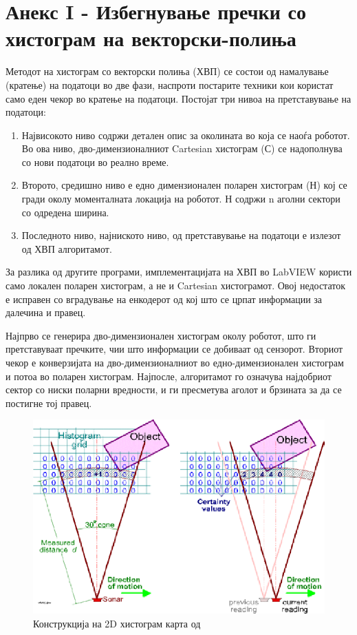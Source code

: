 \documentclass[12pt]{article}
\begin{document}
\section{Анекс I - Избегнување пречки со хистограм на векторски-полиња} %
  \label{sec:app1-avoidance}
  Методот на хистограм со векторски полиња (ХВП) се состои од намалување (кратење) на податоци во две фази, наспроти постарите техники кои користат само еден чекор во кратење на податоци. Постојат три нивоа на претставување на податоци:

  \begin{enumerate}
    \item Највисокото ниво содржи детален опис за околината во која се наоѓа роботот. Во ова ниво, дво-димензионалниот Cartesian хистограм (С) се надополнува со нови податоци во реално време.
    \item Второто, средишно ниво е едно димензионален поларен хистограм (Н) кој се гради околу моменталната локација на роботот. Н содржи n аголни сектори со одредена ширина.
    \item Последното ниво, најниското ниво, од претставување на податоци е излезот од ХВП алгоритамот.
    \end{enumerate}

  За разлика од другите програми, имплементацијата на ХВП во LabVIEW користи само локален поларен хистограм, а не и Cartesian хистограмот. Овој недостаток е исправен со вградување на енкодерот од кој што се црпат информации за далечина и правец.

  Најпрво се генерира дво-димензионален хистограм околу роботот, што ги претставуваат пречките, чии што информации се добиваат од сензорот. Вториот чекор е конверзијата на дво-димензионалниот во едно-димензионален хистограм и потоа во поларен хистограм. Најпосле, алгоритамот го означува најдобриот сектор со ниски поларни вредности, и ги пресметува аголот и брзината за да се постигне тој правец.

  \begin{figure}[H]
    \centering
    \includegraphics[width=0.5\linewidth]{./images/2d_his.png}
    \caption{Конструкција на 2D хистограм карта од \cite{vfh_images}}
    \label{fig:2d_his.png}
    \end{figure}
\end{document}
